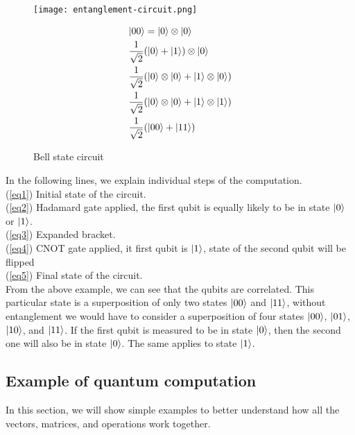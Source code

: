 \begin{figure}[H]
\begin{minipage}{.35\textwidth}
    \texttt{[image: entanglement-circuit.png]}
    \caption{Bell state circuit}

\end{minipage}
\hfill
\begin{minipage}{.50\textwidth}
  \begin{align} 
             &\lvert00\rangle = \lvert0\rangle \otimes \lvert0\rangle \label{eq1} \\
             &\frac{1}{\sqrt{2}}(\lvert0\rangle + \lvert1\rangle) \otimes \lvert0\rangle \label{eq2}\\
             &\frac{1}{\sqrt{2}}(\lvert0\rangle \otimes \lvert0\rangle + \lvert1\rangle \otimes \lvert0\rangle) \label{eq3} \\
             &\frac{1}{\sqrt{2}}(\lvert0\rangle \otimes \lvert0\rangle + \lvert1\rangle \otimes \lvert1\rangle) \label{eq4}\\
             &\frac{1}{\sqrt{2}}(\lvert00\rangle + \lvert11\rangle) \label{eq5}
  \end{align}
\end{minipage}
\end{figure}

\noindent In the following lines, we explain individual steps of the computation.\\
\noindent (\ref{eq1}) Initial state of the circuit.\\
(\ref{eq2}) Hadamard gate applied, the first qubit is equally likely to be in state $\lvert0\rangle$ or $\lvert1\rangle$.\\
(\ref{eq3}) Expanded bracket.\\
(\ref{eq4}) CNOT gate applied, it first qubit is $\lvert1\rangle$, state of the second qubit will be flipped\\
(\ref{eq5}) Final state of the circuit.\\

\noindent From the above example, we can see that the qubits are correlated. This particular state is a superposition of only two states $\lvert00\rangle$ and $\lvert11\rangle$, without entanglement we would have to consider a superposition of four states $\lvert00\rangle$, $\lvert01\rangle$, $\lvert10\rangle$, and $\lvert11\rangle$. If the first qubit is measured to be in state $\lvert0\rangle$, then the second one will also be in state $\lvert0\rangle$. The same applies to state $\lvert1\rangle$.

\subsection{Example of quantum computation}
In this section, we will show simple examples to better understand how all the vectors, matrices, and operations work together.

